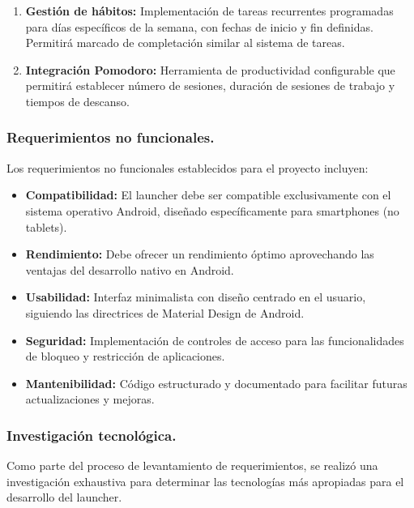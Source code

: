 \begin{enumerate}
    \item \textbf{Gestión de hábitos:} Implementación de tareas recurrentes programadas para días específicos de la semana, con fechas de inicio y fin definidas. Permitirá marcado de completación similar al sistema de tareas.
    
    \item \textbf{Integración Pomodoro:} Herramienta de productividad configurable que permitirá establecer número de sesiones, duración de sesiones de trabajo y tiempos de descanso.
\end{enumerate}

\subsubsection{Requerimientos no funcionales.}

Los requerimientos no funcionales establecidos para el proyecto incluyen:

\begin{itemize}
    \item \textbf{Compatibilidad:} El launcher debe ser compatible exclusivamente con el sistema operativo Android, diseñado específicamente para smartphones (no tablets).
    
    \item \textbf{Rendimiento:} Debe ofrecer un rendimiento óptimo aprovechando las ventajas del desarrollo nativo en Android.
    
    \item \textbf{Usabilidad:} Interfaz minimalista con diseño centrado en el usuario, siguiendo las directrices de Material Design de Android.
    
    \item \textbf{Seguridad:} Implementación de controles de acceso para las funcionalidades de bloqueo y restricción de aplicaciones.
    
    \item \textbf{Mantenibilidad:} Código estructurado y documentado para facilitar futuras actualizaciones y mejoras.
\end{itemize}

\subsubsection{Investigación tecnológica.}

Como parte del proceso de levantamiento de requerimientos, se realizó una investigación exhaustiva para determinar las tecnologías más apropiadas para el desarrollo del launcher.

